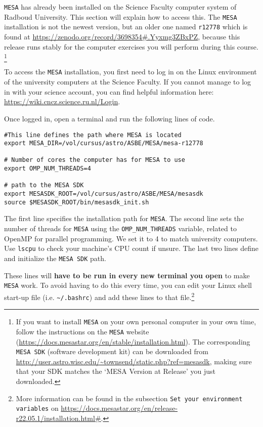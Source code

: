 \documentclass[11pt,a4paper]{article}
\begin{document}
\texttt{MESA} has already been installed on the Science Faculty computer system of Radboud University. This section will explain how to access this. The \texttt{MESA} installation is not the newest version, but an older one named \texttt{r12778} which is found at \url{https://zenodo.org/record/3698354#.Yyxmg3ZBxPZ}, because this release runs stably for the computer exercises you will perform during this course.
\footnote{If you want to install \texttt{MESA} on your own personal computer in your own time, follow the instructions on the \texttt{MESA} website (\url{https://docs.mesastar.org/en/stable/installation.html}). The corresponding \texttt{MESA SDK} (software development kit) can be downloaded from \url{http://user.astro.wisc.edu/~townsend/static.php?ref=mesasdk}, making sure that your SDK matches the `MESA Version at Release' you just downloaded. }

\bigskip\noindent
To access the \texttt{MESA} installation, you first need to log in on the Linux environment of the university computers at the Science Faculty. If you cannot manage to log in with your science account, you can find helpful information here: \url{https://wiki.cncz.science.ru.nl/Login}. 

\bigskip\noindent
Once logged in, open a terminal and run the following lines of code. 

\begin{lstlisting}
#This line defines the path where MESA is located 
export MESA_DIR=/vol/cursus/astro/ASBE/MESA/mesa-r12778

# Number of cores the computer has for MESA to use
export OMP_NUM_THREADS=4

# path to the MESA SDK
export MESASDK_ROOT=/vol/cursus/astro/ASBE/MESA/mesasdk
source $MESASDK_ROOT/bin/mesasdk_init.sh
\end{lstlisting}
The first line specifies the installation path for \texttt{MESA}. 
The second line sets the number of threads for \texttt{MESA} using the \texttt{OMP\_NUM\_THREADS} variable, related to OpenMP for parallel programming. 
We set it to 4 to match university computers. 
Use \texttt{lscpu} to check your machine's CPU count if unsure. 
The last two lines define and initialize the \texttt{MESA SDK} path.


These lines will \textbf{have to be run in every new terminal you open} to make \texttt{MESA} work. 
To avoid having to do this every time, you can edit your Linux shell start-up file (i.e. \verb|~/.bashrc|) and add these lines to that file.\footnote{More information can be found in the subsection \texttt{Set your environment variables} on \url{https://docs.mesastar.org/en/release-r22.05.1/installation.html\#}.}
\end{document}
